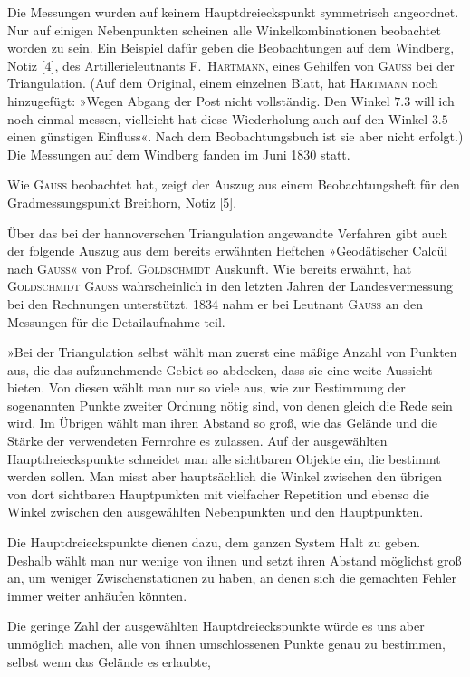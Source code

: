 Die Messungen wurden auf keinem Hauptdreieckspunkt symmetrisch angeordnet. Nur auf einigen Nebenpunkten scheinen alle Winkelkombinationen beobachtet worden zu sein. Ein Beispiel dafür geben die Beobachtungen auf dem Windberg, Notiz [4], des Artillerieleutnants F.~\textsc{Hartmann}, eines Gehilfen von \textsc{Gauss} bei der Triangulation. (Auf dem Original, einem einzelnen Blatt, hat \textsc{Hartmann} noch hinzugefügt: »Wegen Abgang der Post nicht vollständig. Den Winkel \(7.3\) will ich noch einmal messen, vielleicht hat diese Wiederholung auch auf den Winkel \(3.5\) einen günstigen Einfluss«. Nach dem Beobachtungsbuch ist sie aber nicht erfolgt.) Die Messungen auf dem Windberg fanden im Juni 1830 statt.

Wie \textsc{Gauss} beobachtet hat, zeigt der Auszug aus einem Beobachtungsheft für den Gradmessungspunkt Breithorn, Notiz [5].

Über das bei der hannoverschen Triangulation angewandte Verfahren gibt auch der folgende Auszug aus dem bereits erwähnten Heftchen »Geodätischer Calcül nach \textsc{Gauss}« von Prof. \textsc{Goldschmidt} Auskunft. Wie bereits erwähnt, hat \textsc{Goldschmidt} \textsc{Gauss} wahrscheinlich in den letzten Jahren der Landesvermessung bei den Rechnungen unterstützt. 1834 nahm er bei Leutnant \textsc{Gauss} an den Messungen für die Detailaufnahme teil.

»Bei der Triangulation selbst wählt man zuerst eine mäßige Anzahl von Punkten aus, die das aufzunehmende Gebiet so abdecken, dass sie eine weite Aussicht bieten. Von diesen  wählt man nur so viele aus, wie zur Bestimmung der sogenannten Punkte zweiter Ordnung nötig sind, von denen gleich die Rede sein wird. Im Übrigen wählt man ihren Abstand so groß, wie das Gelände und die Stärke der verwendeten Fernrohre es zulassen. Auf  der ausgewählten Hauptdreieckspunkte schneidet man alle sichtbaren Objekte ein, die bestimmt werden sollen. Man misst aber hauptsächlich die Winkel zwischen den übrigen von dort sichtbaren Hauptpunkten mit vielfacher Repetition und ebenso die Winkel zwischen den ausgewählten Nebenpunkten und den Hauptpunkten.

Die Hauptdreieckspunkte dienen dazu, dem ganzen System Halt zu geben. Deshalb wählt man nur wenige von ihnen und setzt ihren Abstand möglichst groß an, um weniger Zwischenstationen zu haben, an denen sich die gemachten Fehler immer weiter anhäufen könnten.

Die geringe Zahl der ausgewählten Hauptdreieckspunkte würde es uns aber unmöglich machen, alle von ihnen umschlossenen Punkte genau zu bestimmen, selbst wenn das Gelände es erlaubte,

